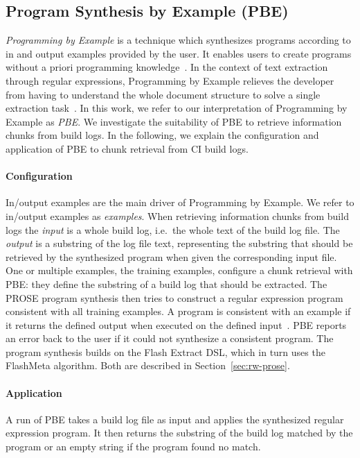 \documentclass[\myrootdir/main.tex]{subfiles}
\begin{document}
\subsection{Program Synthesis by Example (PBE)}
\label{sec:expl-pbe}
\emph{Programming by Example} is a technique which synthesizes programs according to in and output examples provided by the user.
It enables users to create programs without a priori programming knowledge~\cite{mayer2015user}.
In the context of text extraction through regular expressions, Programming by Example relieves the developer from having to understand the whole document structure to solve a single extraction task~\cite{le2014flashextract:}.
In this work, we refer to our interpretation of Programming by Example as \emph{PBE}\@.
We investigate the suitability of PBE to retrieve information chunks from build logs.
In the following, we explain the configuration and application of PBE to chunk retrieval from CI build logs.

\paragraph{Configuration}
In/output examples are the main driver of Programming by Example.
We refer to in/output examples as \emph{examples}.
When retrieving information chunks from build logs the \emph{input} is a whole build log, i.e.\ the whole text of the build log file.
The \emph{output} is a substring of the log file text, representing the substring that should be retrieved by the synthesized program when given the corresponding input file.
One or multiple examples, the training examples, configure a chunk retrieval with PBE: they define the substring of a build log that should be extracted.
The PROSE program synthesis then tries to construct a regular expression program consistent with all training examples.
A program is consistent with an example if it returns the defined output when executed on the defined input~\cite{mitchell1982generalization}.
PBE reports an error back to the user if it could not synthesize a consistent program.
The program synthesis builds on the Flash Extract DSL, which in turn uses the FlashMeta algorithm.
Both are described in Section~\ref{sec:rw-prose}.

\paragraph{Application}
A run of PBE takes a build log file as input and applies the synthesized regular expression program.
It then returns the substring of the build log matched by the program or an empty string if the program found no match.
\end{document}
